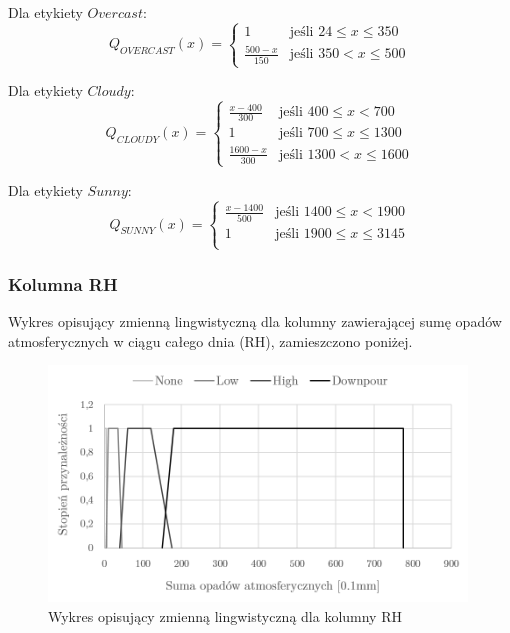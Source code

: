 \documentclass{classrep}
\begin{document}
Dla etykiety $Overcast$:
\begin{equation}
{Q}_{OVERCAST}(x)= \left\{ \begin{array}{ll}
1 			& \textrm{jeśli $24 \leq x \leq 350$} \\
\frac{500-x}{150}& \textrm{jeśli $350 < x \leq 500$}
\end{array} \right.
\end{equation}

Dla etykiety $Cloudy$:
\begin{equation}
{Q}_{CLOUDY}(x)= \left\{ \begin{array}{ll}
\frac{x-400}{300} & \textrm{jeśli $400 \leq x < 700$} \\
1 			 & \textrm{jeśli $700 \leq x \leq 1300$} \\
\frac{1600-x}{300} & \textrm{jeśli $1300 < x \leq 1600$}
\end{array} \right.
\end{equation}

Dla etykiety $Sunny$:
\begin{equation}
{Q}_{SUNNY}(x)= \left\{ \begin{array}{ll}
\frac{x-1400}{500} & \textrm{jeśli $1400 \leq x < 1900$} \\
1 			 & \textrm{jeśli $1900 \leq x \leq 3145$} \\
\end{array} \right.
\end{equation}

\clearpage



\subsubsection{Kolumna RH}
Wykres opisujący zmienną lingwistyczną dla kolumny zawierającej sumę opadów atmosferycznych w ciągu całego dnia (RH), zamieszczono poniżej.
\begin{figure}[H]
	\centering
	\includegraphics[width=0.99\textwidth]{Pictures/TermsCharts/RH.png}
	\caption{Wykres opisujący zmienną lingwistyczną dla kolumny RH}
\end{figure}
\end{document}
